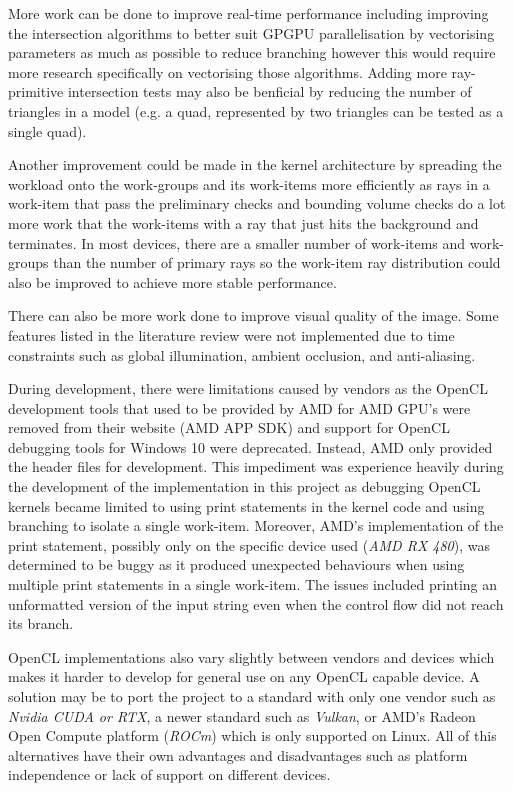 \documentclass[final]{cmpreport}
\begin{document}
More work can be done to improve real-time performance including improving the intersection algorithms to better suit GPGPU parallelisation by vectorising parameters as much as possible to reduce branching however this would require more research specifically on vectorising those algorithms. Adding more ray-primitive intersection tests may also be benficial by reducing the number of triangles in a model (e.g. a quad, represented by two triangles can be tested as a single quad).

Another improvement could be made in the kernel architecture by spreading the workload onto the work-groups and its work-items more efficiently as rays in a work-item that pass the preliminary checks and bounding volume checks do a lot more work that the work-items with a ray that just hits the background and terminates. In most devices, there are a smaller number of work-items and work-groups than the number of primary rays so the work-item ray distribution could also be improved to achieve more stable performance.

There can also be more work done to improve visual quality of the image. Some features listed in the literature review were not implemented due to time constraints such as global illumination, ambient occlusion, and anti-aliasing.

During development, there were limitations caused by vendors as the OpenCL development tools that used to be provided by AMD for AMD GPU's were removed from their website (AMD APP SDK) and support for OpenCL debugging tools for Windows 10 were deprecated. Instead, AMD only provided the header files for development. This impediment was experience heavily during the development of the implementation in this project as debugging OpenCL kernels became limited to using print statements in the kernel code and using branching to isolate a single work-item. Moreover, AMD's implementation of the print statement, possibly only on the specific device used (\textit{AMD RX 480}), was determined to be buggy as it produced unexpected behaviours when using multiple print statements in a single work-item. The issues included printing an unformatted version of the input string even when the control flow did not reach its branch.

OpenCL implementations also vary slightly between vendors and devices which makes it harder to develop for general use on any OpenCL capable device. A solution may be to port the project to a standard with only one vendor such as \textit{Nvidia CUDA or RTX}, a newer standard such as \textit{Vulkan}, or AMD's Radeon Open Compute platform (\textit{ROCm}) which is only supported on Linux. All of this alternatives have their own advantages and disadvantages such as platform independence or lack of support on different devices.
\end{document}

